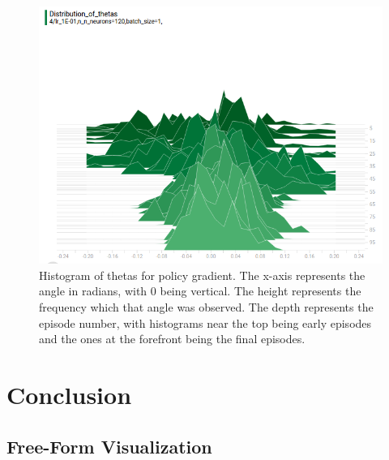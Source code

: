 \documentclass[12pt,a4paper]{article}
\begin{document}
\begin{figure}[htbp]
\begin{center}
\includegraphics[width=\linewidth]{pg_thetas.png}
\caption{Histogram of thetas for policy gradient. The x-axis represents the angle in radians, with 0 being vertical. The height represents the frequency which that angle was observed. The depth represents the episode number, with histograms near the top being early episodes and the ones at the forefront being the final episodes.}
\label{pg_thetas}
\end{center}
\end{figure}



\section{Conclusion}
%
\subsection*{Free-Form Visualization}
%
\end{document}
